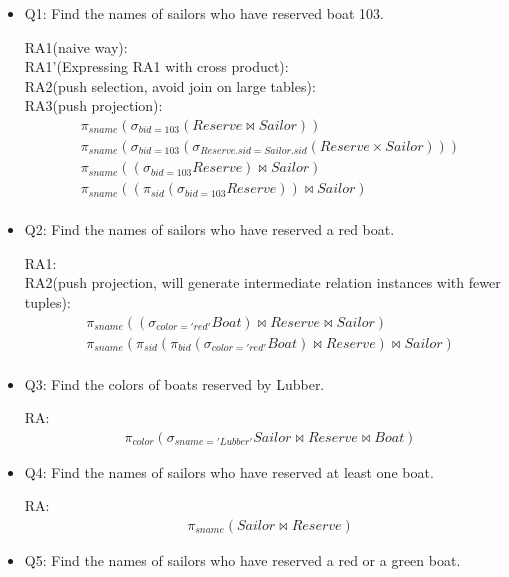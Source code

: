 \documentclass[10pt]{article}
\begin{document}
\begin{itemize}
\item Q1: Find the names of sailors who have reserved boat 103.

  RA1(naive way):\\
  RA1'(Expressing RA1 with cross product):\\
  RA2(push selection, avoid join on large tables):\\
  RA3(push projection):
  \begin{align*}
    &\pi_{sname}(\sigma_{bid=103}(Reserve \bowtie Sailor))\\
    &\pi_{sname}(\sigma_{bid=103}(\sigma_{Reserve.sid=Sailor.sid}(Reserve
    \times Sailor)))\\
    &\pi_{sname}((\sigma_{bid=103}Reserve) \bowtie Sailor)\\
    &\pi_{sname}((\pi_{sid}(\sigma_{bid=103}Reserve)) \bowtie Sailor)\\
  \end{align*}

\item Q2: Find the names of sailors who have reserved a red boat.

  RA1:\\
  RA2(push projection, will generate intermediate relation instances
  with fewer tuples):\\
  \begin{align*}
    &\pi_{sname}((\sigma_{color='red'}Boat) \bowtie Reserve \bowtie
    Sailor)\\
    &\pi_{sname}(\pi_{sid}(\pi_{bid}(\sigma_{color='red'}Boat) \bowtie Reserve) \bowtie
    Sailor)\\
  \end{align*}

\item Q3: Find the colors of boats reserved by Lubber.

  RA: 
  \begin{align*}
    &\pi_{color}(\sigma_{sname='Lubber'}Sailor \bowtie Reserve \bowtie Boat)
  \end{align*}

\item Q4: Find the names of sailors who have reserved at least one
  boat.

  RA:
  \begin{align*}
    &\pi_{sname}(Sailor \bowtie Reserve)
  \end{align*}

\item Q5: Find the names of sailors who have reserved a red or a green
  boat.


\end{itemize}
\end{document}
